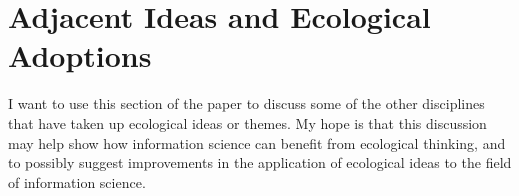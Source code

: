\section{Adjacent Ideas and Ecological Adoptions}

I want to use this section of the paper to discuss some of the other disciplines that have taken up ecological ideas or themes. My hope is that this discussion may help show how information science can benefit from ecological thinking, and to possibly suggest improvements in the application of ecological ideas to the field of information science.
